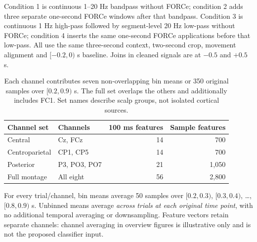 \documentclass[11pt,a4paper]{article}
\begin{document}
Condition 1 is continuous 1--20 Hz bandpass without FORCe; condition 2 adds three separate one-second FORCe windows after that bandpass. Condition 3 is continuous 1 Hz high-pass followed by segment-level 20 Hz low-pass without FORCe; condition 4 inserts the same one-second FORCe applications before that low-pass. All use the same three-second context, two-second crop, movement alignment and $[-0.2,0)$ s baseline. Joins in cleaned signals are at $-0.5$ and $+0.5$ s.
\begin{table}[H]\centering\small
\begin{tabular}{@{}llrr@{}}\toprule
Channel set & Channels & 100 ms features & Sample features\\\midrule
Central & Cz, FCz & 14 & 700\\
Centroparietal & CP1, CP5 & 14 & 700\\
Posterior & P3, PO3, PO7 & 21 & 1,050\\
Full montage & All eight & 56 & 2,800\\\bottomrule
\end{tabular}
\caption{Each channel contributes seven non-overlapping bin means or 350 original samples over $[0.2,0.9)$ s. The full set overlaps the others and additionally includes FC1. Set names describe scalp groups, not isolated cortical sources.}\label{tab:sets}
\end{table}
For every trial/channel, bin means average 50 samples over $[0.2,0.3)$, $[0.3,0.4)$, \ldots, $[0.8,0.9)$ s. Unbinned means average \emph{across trials at each original time point}, with no additional temporal averaging or downsampling. Feature vectors retain separate channels: channel averaging in overview figures is illustrative only and is not the proposed classifier input.
\clearpage
\end{document}
